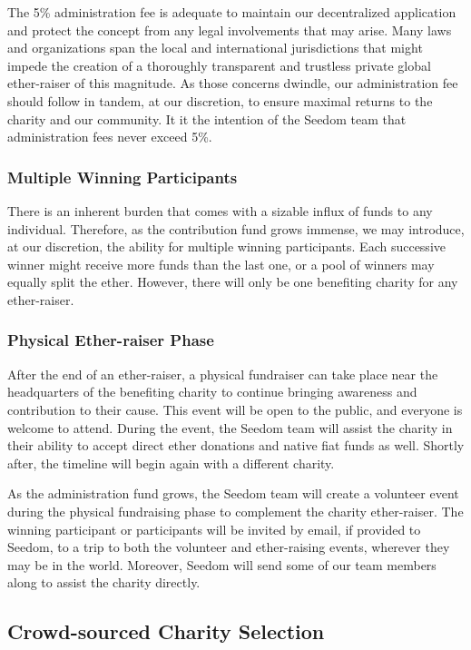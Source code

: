 \documentclass[11pt]{article}
\begin{document}
The 5\% administration fee is adequate to maintain our decentralized application and protect the concept from any legal involvements that may arise. Many laws and organizations span the local and international jurisdictions that might impede the creation of a thoroughly transparent and trustless private global ether-raiser of this magnitude. As those concerns dwindle, our administration fee should follow in tandem, at our discretion, to ensure maximal returns to the charity and our community. It it the intention of the Seedom team that administration fees never exceed 5\%.

\subsubsection{Multiple Winning Participants}

There is an inherent burden that comes with a sizable influx of funds to any individual. Therefore, as the contribution fund grows immense, we may introduce, at our discretion, the ability for multiple winning participants. Each successive winner might receive more funds than the last one, or a pool of winners may equally split the ether. However, there will only be one benefiting charity for any ether-raiser.

\subsubsection{Physical Ether-raiser Phase}

After the end of an ether-raiser, a physical fundraiser can take place near the headquarters of the benefiting charity to continue bringing awareness and contribution to their cause. This event will be open to the public, and everyone is welcome to attend. During the event, the Seedom team will assist the charity in their ability to accept direct ether donations and native fiat funds as well. Shortly after, the timeline will begin again with a different charity.

As the administration fund grows, the Seedom team will create a volunteer event during the physical fundraising phase to complement the charity ether-raiser. The winning participant or participants will be invited by email, if provided to Seedom, to a trip to both the volunteer and ether-raising events, wherever they may be in the world. Moreover, Seedom will send some of our team members along to assist the charity directly.

\subsection{Crowd-sourced Charity Selection}
\end{document}
